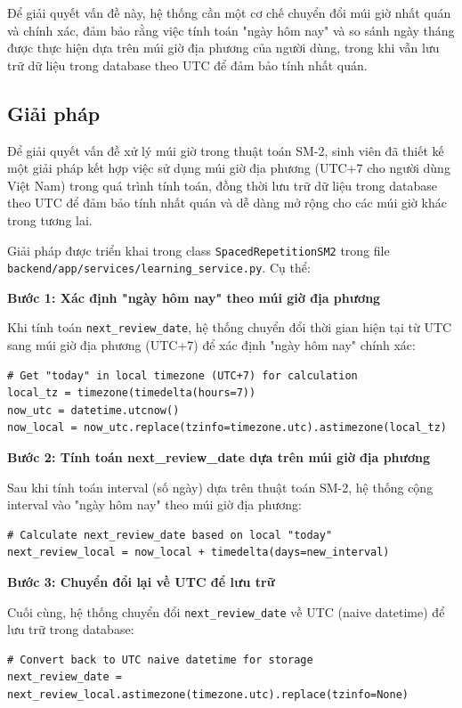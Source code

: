 \documentclass[../DoAn.tex]{subfiles}
\begin{document}
Để giải quyết vấn đề này, hệ thống cần một cơ chế chuyển đổi múi giờ nhất quán và chính xác, đảm bảo rằng việc tính toán "ngày hôm nay" và so sánh ngày tháng được thực hiện dựa trên múi giờ địa phương của người dùng, trong khi vẫn lưu trữ dữ liệu trong database theo UTC để đảm bảo tính nhất quán.

\subsection{Giải pháp}
\label{subsection:5.1.2}

Để giải quyết vấn đề xử lý múi giờ trong thuật toán SM-2, sinh viên đã thiết kế một giải pháp kết hợp việc sử dụng múi giờ địa phương (UTC+7 cho người dùng Việt Nam) trong quá trình tính toán, đồng thời lưu trữ dữ liệu trong database theo UTC để đảm bảo tính nhất quán và dễ dàng mở rộng cho các múi giờ khác trong tương lai.

Giải pháp được triển khai trong class \texttt{SpacedRepetitionSM2} trong file \texttt{backend/app/services/learning_service.py}. Cụ thể:

\textbf{Bước 1: Xác định "ngày hôm nay" theo múi giờ địa phương}

Khi tính toán \texttt{next\_review\_date}, hệ thống chuyển đổi thời gian hiện tại từ UTC sang múi giờ địa phương (UTC+7) để xác định "ngày hôm nay" chính xác:

\begin{verbatim}
# Get "today" in local timezone (UTC+7) for calculation
local_tz = timezone(timedelta(hours=7))
now_utc = datetime.utcnow()
now_local = now_utc.replace(tzinfo=timezone.utc).astimezone(local_tz)
\end{verbatim}

\textbf{Bước 2: Tính toán next\_review\_date dựa trên múi giờ địa phương}

Sau khi tính toán interval (số ngày) dựa trên thuật toán SM-2, hệ thống cộng interval vào "ngày hôm nay" theo múi giờ địa phương:

\begin{verbatim}
# Calculate next_review_date based on local "today"
next_review_local = now_local + timedelta(days=new_interval)
\end{verbatim}

\textbf{Bước 3: Chuyển đổi lại về UTC để lưu trữ}

Cuối cùng, hệ thống chuyển đổi \texttt{next\_review\_date} về UTC (naive datetime) để lưu trữ trong database:

\begin{verbatim}
# Convert back to UTC naive datetime for storage
next_review_date = next_review_local.astimezone(timezone.utc).replace(tzinfo=None)
\end{verbatim}
\end{document}
